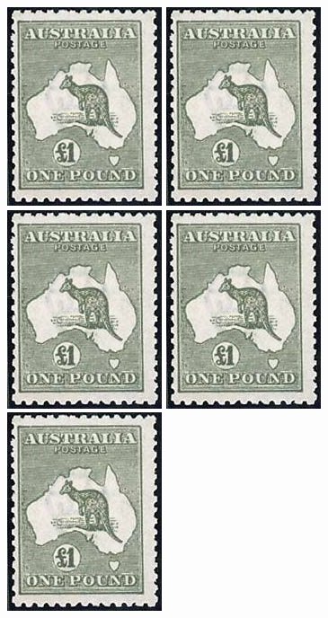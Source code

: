 \documentclass[justified]{tufte-book}
\begin{document}
\includegraphics[scale=0.39659]{./graphics/australia/SG75}
\includegraphics[scale=0.39659]{./graphics/australia/SG75}
\includegraphics[scale=0.39659]{./graphics/australia/SG75}
\includegraphics[scale=0.39659]{./graphics/australia/SG75}
\includegraphics[scale=0.39659]{./graphics/australia/SG75}
\end{document}
